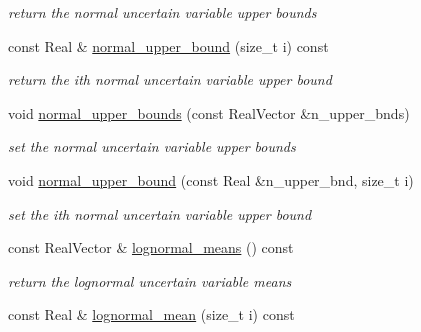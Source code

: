 \begin{DoxyCompactItemize}
\begin{DoxyCompactList}\small\item\em return the normal uncertain variable upper bounds \end{DoxyCompactList}\item 
const Real \& \hyperlink{classPecos_1_1AleatoryDistParams_a4d28138c4a84d769f84fb311e0481d85}{normal\+\_\+upper\+\_\+bound} (size\+\_\+t i) const \label{classPecos_1_1AleatoryDistParams_a4d28138c4a84d769f84fb311e0481d85}

\begin{DoxyCompactList}\small\item\em return the ith normal uncertain variable upper bound \end{DoxyCompactList}\item 
void \hyperlink{classPecos_1_1AleatoryDistParams_a3ac2f359eb279e90985f1f0f782da025}{normal\+\_\+upper\+\_\+bounds} (const Real\+Vector \&n\+\_\+upper\+\_\+bnds)\label{classPecos_1_1AleatoryDistParams_a3ac2f359eb279e90985f1f0f782da025}

\begin{DoxyCompactList}\small\item\em set the normal uncertain variable upper bounds \end{DoxyCompactList}\item 
void \hyperlink{classPecos_1_1AleatoryDistParams_a21621042c30d09ea570490ffbc4b7b20}{normal\+\_\+upper\+\_\+bound} (const Real \&n\+\_\+upper\+\_\+bnd, size\+\_\+t i)\label{classPecos_1_1AleatoryDistParams_a21621042c30d09ea570490ffbc4b7b20}

\begin{DoxyCompactList}\small\item\em set the ith normal uncertain variable upper bound \end{DoxyCompactList}\item 
const Real\+Vector \& \hyperlink{classPecos_1_1AleatoryDistParams_a680a6f60168e31fd3df436c0702d9a12}{lognormal\+\_\+means} () const \label{classPecos_1_1AleatoryDistParams_a680a6f60168e31fd3df436c0702d9a12}

\begin{DoxyCompactList}\small\item\em return the lognormal uncertain variable means \end{DoxyCompactList}\item 
const Real \& \hyperlink{classPecos_1_1AleatoryDistParams_a9752a3c5b889ca30500687d9be36c4d7}{lognormal\+\_\+mean} (size\+\_\+t i) const \label{classPecos_1_1AleatoryDistParams_a9752a3c5b889ca30500687d9be36c4d7}


\end{DoxyCompactItemize}
